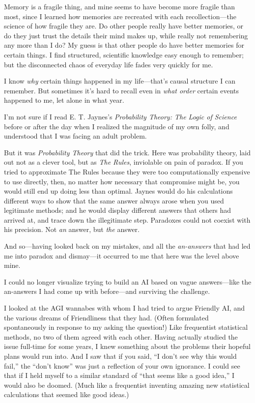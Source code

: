 {
 Memory is a fragile thing, and mine seems to have become more
fragile than most, since I learned how memories are recreated with each
recollection---the science of how fragile they are. Do other people
really have better memories, or do they just trust the details their
mind makes up, while really not remembering any more than I do? My
guess is that other people do have better memories for certain things.
I find structured, scientific knowledge easy enough to remember; but
the disconnected chaos of everyday life fades very quickly for me.}

{
 I know \textit{why} certain things happened in my
life---that's causal structure I can remember. But
sometimes it's hard to recall even in \textit{what
order} certain events happened to me, let alone in what year.}

{
 I'm not sure if I read E. T.
Jaynes's \textit{Probability Theory: The Logic of
Science} before or after the day when I realized the magnitude of my
own folly, and understood that I was facing an adult problem.}

{
 But it was \textit{Probability Theory} that did the trick. Here
was probability theory, laid out not as a clever tool, but as
\textit{The Rules}, inviolable on pain of paradox. If you tried to
approximate The Rules because they were too computationally expensive
to use directly, then, no matter how necessary that compromise might
be, you would still end up doing less than optimal. Jaynes would do his
calculations different ways to show that the same answer always arose
when you used legitimate methods; and he would display different
answers that others had arrived at, and trace down the illegitimate
step. Paradoxes could not coexist with his precision. Not \textit{an}
answer, but \textit{the} answer.}

{
 And so---having looked back on my mistakes, and all the
\textit{an-answers} that had led me into paradox and dismay---it
occurred to me that here was the level above mine.}

{
 I could no longer visualize trying to build an AI based on vague
answers---like the an-answers I had come up with before---and surviving
the challenge.}

{
 I looked at the AGI wannabes with whom I had tried to argue
Friendly AI, and the various dreams of Friendliness that they had.
(Often formulated spontaneously in response to my asking the question!)
Like frequentist statistical methods, no two of them agreed with each
other. Having actually studied the issue full-time for some years, I
knew something about the problems their hopeful plans would run into.
And I saw that if you said, ``I don't
see why this would fail,'' the
``don't know'' was
just a reflection of your own ignorance. I could see that if I held
myself to a similar standard of ``that seems like a
good idea,'' I would also be doomed. (Much like a
frequentist inventing amazing new statistical calculations that seemed
like good ideas.)}

